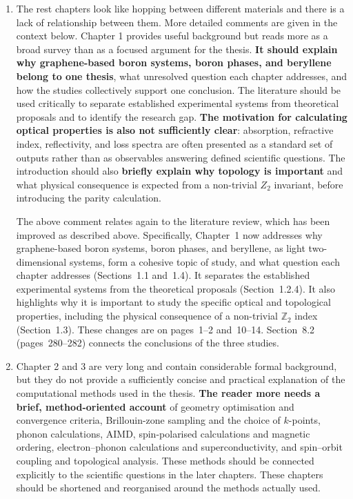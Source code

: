 \documentclass[12pt,a4paper]{article}
\newenvironment{reply}{\par\medskip\color{replyblue}}{\par\medskip}
\begin{document}
\begin{enumerate}[leftmargin=*]
\item The rest chapters look like hopping between different materials and there is a lack of relationship between them. More detailed comments are given in the context below. Chapter 1 provides useful background but reads more as a broad survey than as a focused argument for the thesis. \textbf{It should explain why graphene-based boron systems, boron phases, and beryllene belong to one thesis}, what unresolved question each chapter addresses, and how the studies collectively support one conclusion. The literature should be used critically to separate established experimental systems from theoretical proposals and to identify the research gap. \textbf{The motivation for calculating optical properties is also not sufficiently clear}: absorption, refractive index, reflectivity, and loss spectra are often presented as a standard set of outputs rather than as observables answering defined scientific questions. The introduction should also \textbf{briefly explain why topology is important} and what physical consequence is expected from a non-trivial $Z_2$ invariant, before introducing the parity calculation.

\begin{reply}
The above comment relates again to the literature review, which has been improved as described above.
Specifically, Chapter~1 now addresses why graphene-based boron systems, boron phases, and beryllene, as light two-dimensional systems, form a cohesive topic of study, and what question each chapter addresses (Sections~1.1 and~1.4).
It separates the established experimental systems from the theoretical proposals (Section~1.2.4).
It also highlights why it is important to study the specific optical and topological properties, including the physical consequence of a non-trivial $\mathbb{Z}_2$ index (Section~1.3).
These changes are on pages~1--2 and~10--14.
Section~8.2 (pages~280--282) connects the conclusions of the three studies.
\end{reply}

\item Chapter 2 and 3 are very long and contain considerable formal background, but they do not provide a sufficiently concise and practical explanation of the computational methods used in the thesis. \textbf{The reader more needs a brief, method-oriented account} of geometry optimisation and convergence criteria, Brillouin-zone sampling and the choice of $k$-points, phonon calculations, AIMD, spin-polarised calculations and magnetic ordering, electron--phonon calculations and superconductivity, and spin--orbit coupling and topological analysis. These methods should be connected explicitly to the scientific questions in the later chapters. These chapters should be shortened and reorganised around the methods actually used.


\end{enumerate}
\end{document}

